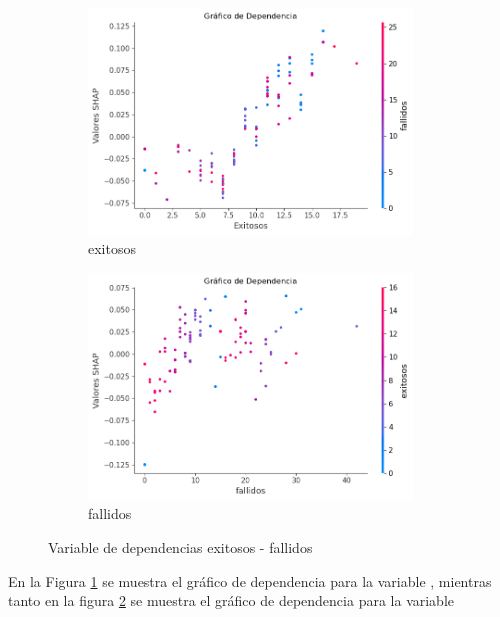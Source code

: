 \begin{figure}[H]

    \begin{subfigure}{0.5\textwidth}
        \includegraphics[width=0.9\linewidth, height=6cm]{img/shap_rf/exitosos.png}
        \caption{exitosos}
        \label{fig:dependencia_exitosos}
    \end{subfigure}
    \begin{subfigure}{0.5\textwidth}
        \includegraphics[width=0.9\linewidth, height=6cm]{img/shap_rf/fallidos.png}
        \caption{fallidos}
        \label{fig:dependencia_fallidos}
    \end{subfigure}

    \caption{Variable de dependencias exitosos - fallidos}
    \label{fig:image2}
\end{figure}

En la Figura \ref{fig:dependencia_exitosos} se muestra el gráfico de dependencia para la variable , mientras tanto en la figura \ref{fig:dependencia_fallidos} se muestra el gráfico de dependencia para la variable 

